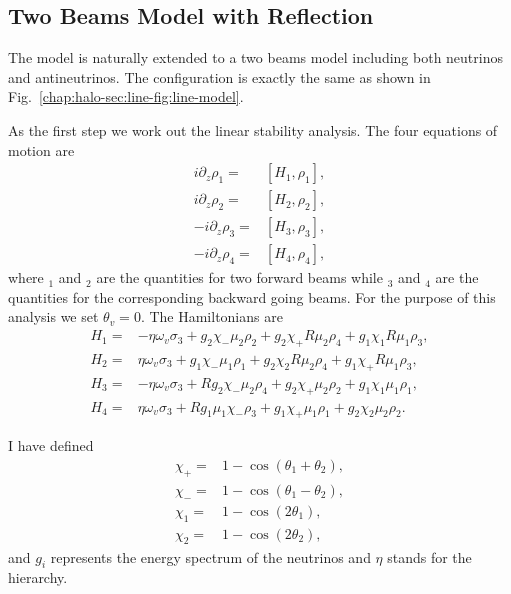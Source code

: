 \subsection{Two Beams Model with Reflection}

The model is naturally extended to a two beams model including both neutrinos and antineutrinos. The configuration is exactly the same as shown in Fig.~\ref{chap:halo-sec:line-fig:line-model}.

As the first step we work out the linear stability analysis. The four equations of motion are
\begin{align}
    i \partial_z \rho_1 = & [ H_1, \rho_1 ], \\
    i \partial_z \rho_2 = & [ H_2, \rho_2 ], \\
    -i \partial_z \rho_3 = & [ H_3, \rho_3 ], \\
    -i \partial_z \rho_4 = & [ H_4, \rho_4 ],
\end{align}
where ${}_1$ and ${}_2$ are the quantities for two forward beams while ${}_3$ and ${}_4$ are the quantities for the corresponding backward going beams. For the purpose of this analysis we set $\theta_v = 0$. The Hamiltonians are
\begin{align}
    H_1 =& -\eta \omega_v \sigma_3 + g_2 \chi_- \mu_2 \rho_2 + g_2 \chi_+ R \mu_2 \rho_4 + g_1 \chi_1 R \mu_1 \rho_3, \\
    H_2 =& \eta \omega_v \sigma_3 + g_1 \chi_- \mu_1 \rho_1 + g_2 \chi_2 R \mu_2 \rho_4 + g_1 \chi_+ R \mu_1 \rho_3, \\
    H_3 =& -\eta \omega_v \sigma_3 + R g_2 \chi_- \mu_2 \rho_4 + g_2 \chi_+\mu_2 \rho_2 + g_1 \chi_1 \mu_1 \rho_1, \\
    H_4 =& \eta \omega_v \sigma_3 + R g_1 \mu_1 \chi_- \rho_3 + g_1 \chi_+ \mu_1 \rho_1 + g_2 \chi_2 \mu_2 \rho_2.
\end{align}

I have defined 
\begin{align*}
    \chi_+ = & 1 - \cos ( \theta_1 + \theta_2 ), \\
    \chi_- = & 1 - \cos ( \theta_1 - \theta_2 ), \\
    \chi_1 = & 1 - \cos ( 2\theta_1 ), \\
    \chi_2 = & 1 - \cos ( 2\theta_2 ),
\end{align*}
and $g_i$ represents the energy spectrum of the neutrinos and $\eta$ stands for the hierarchy.


